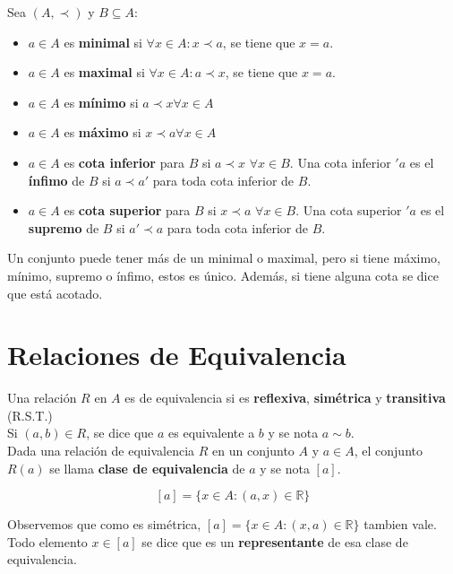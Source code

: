 \documentclass[11pt,a4paper]{article}
\begin{document}
Sea $(A, \prec)$ y $B \subseteq A$:
\begin{itemize}
\item $a \in A$ es \textbf{minimal} si $\forall x \in A : x\prec a$, se tiene que $x = a$.
\item $a \in A$ es \textbf{maximal} si $\forall x \in A : a\prec x$, se tiene que $x = a$.\\

\item $a \in A$ es \textbf{m\'inimo} si $a \prec x \forall x \in A$
\item $a \in A$ es \textbf{m\'aximo} si $x \prec a \forall x \in A$\\

\item $a \in A$ es \textbf{cota inferior} para $B$ si $a \prec x$ $\forall x \in B$. Una cota inferior $'a$ es el \textbf{\'infimo} de $B$ si $a \prec a'$ para toda cota inferior de $B$.
\item $a \in A$ es \textbf{cota superior} para $B$ si $x \prec a$ $\forall x \in B$. Una cota superior $'a$ es el \textbf{supremo} de $B$ si $a' \prec a$ para toda cota inferior de $B$.\\
\end{itemize}
Un conjunto puede tener m\'as de un minimal o maximal, pero si tiene m\'aximo, m\'inimo, supremo o \'infimo, estos es \'unico. Adem\'as, si tiene alguna cota se dice que est\'a acotado.

\noindent \dotfill

\newpage
\section{Relaciones de Equivalencia}
Una relaci\'on $R$ en $A$ es de equivalencia si es \textbf{reflexiva}, \textbf{sim\'etrica} y \textbf{transitiva} (R.S.T.)\\

Si $(a,b) \in R$, se dice que $a$ es equivalente a $b$ y se nota $a \sim b$.\\

Dada una relaci\'on de equivalencia $R$ en un conjunto $A$ y $a \in A$, el conjunto $R(a)$ se llama \textbf{clase de equivalencia} de $a$ y se nota $[a]$.

$$[a] = \{ x \in A : (a,x) \in \mathbb{R} \}$$

Observemos que como es sim\'etrica, $[a] = \{ x \in A : (x,a) \in \mathbb{R} \}$ tambien vale. Todo elemento $x \in [a]$ se dice que es un \textbf{representante} de esa clase de equivalencia.
\end{document}
